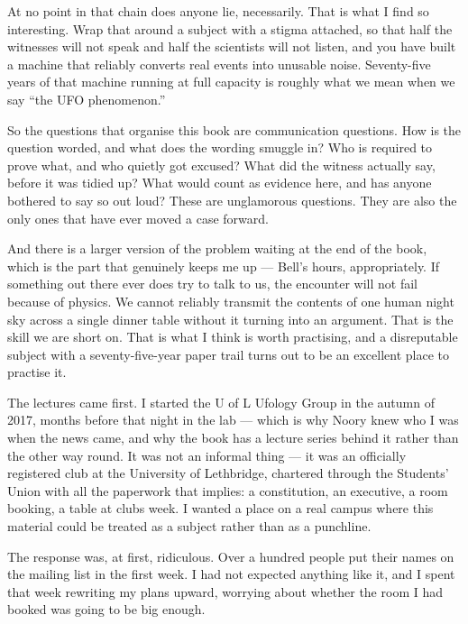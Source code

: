 At no point in that chain does anyone lie, necessarily. That is what I find so
interesting.  Wrap that around a subject with a
stigma attached, so that half the witnesses will not speak and half the
scientists will not listen, and you have built a machine that reliably converts
real events into unusable noise. Seventy-five years of that machine running at
full capacity is roughly what we mean when we say ``the UFO phenomenon.''

So the questions that organise this book are communication questions. How is
the question worded, and what does the wording smuggle in? Who is required to
prove what, and who quietly got excused? What did the witness actually say,
before it was tidied up? What would count as evidence here, and has anyone
bothered to say so out loud? These are unglamorous questions. They are also the
only ones that have ever moved a case forward.

And there is a larger version of the problem waiting at the end of the book,
which is the part that genuinely keeps me up --- Bell's hours, appropriately.
If something out there ever does try to talk to us, the encounter will not fail
because of physics.  We cannot reliably transmit the contents of one human night sky across a
single dinner table without it turning into an argument. That is the skill we
are short on. That is what I think is worth practising, and a disreputable
subject with a seventy-five-year paper trail turns out to be an excellent
place to practise it.


The lectures came first. I started the U of L Ufology Group in the autumn of
2017, months before that night in the lab --- which is why Noory knew who I was
when the news came, and why the book has a lecture series behind it rather than
the other way round. It
was not an informal thing --- it was an officially registered club at the
University of Lethbridge, chartered through the Students' Union with all the
paperwork that implies: a constitution, an executive, a room booking, a table at
clubs week. I wanted a place on a real campus where this material could be
treated as a subject rather than as a punchline.

The response was, at first, ridiculous. Over a hundred people put their names on
the mailing list in the first week. I had not expected anything like it, and I
spent that week rewriting my plans upward, worrying about whether the room I had
booked was going to be big enough.

